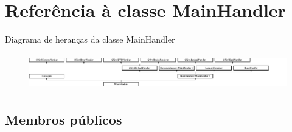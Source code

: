 \hypertarget{class_main_handler}{\section{Referência à classe Main\-Handler}
\label{class_main_handler}
}
Diagrama de heranças da classe Main\-Handler\begin{figure}[H]
\begin{center}
\leavevmode
\includegraphics[height=1.560976cm]{class_main_handler}
\end{center}
\end{figure}
\subsection*{Membros públicos}
